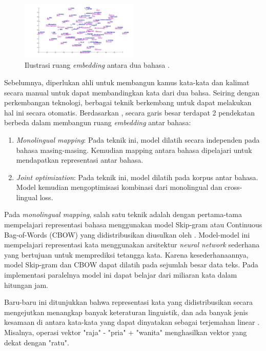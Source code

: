 \documentclass[conference]{IEEEtran}
\begin{document}
	\begin{figure}[htbp]
	    \centerline{
	    \includegraphics[width=0.5\textwidth]{resources/luong_et_al_2015.jpg}}
	    \caption{Ilustrasi ruang \textit{embedding} antara dua bahasa \cite{b8}.}
	    \label{fig:ilustrasi_embedding}
	\end{figure}

	Sebelumnya, diperlukan ahli untuk membangun kamus kata-kata dan kalimat secara manual untuk dapat membandingkan kata dari dua bahsa. Seiring dengan perkembangan teknologi, berbagai teknik berkembang untuk dapat melakukan hal ini secara otomatis. Berdasarkan \cite{b9}, secara garis besar terdapat 2 pendekatan berbeda dalam membangun ruang \textit{embedding} antar bahasa:

	\begin{enumerate}
	    \item \textit{Monolingual mapping}: Pada teknik ini, model dilatih secara independen pada bahasa masing-masing. Kemudian mapping antara bahasa dipelajari untuk mendapatkan representasi antar bahasa.

	    \item \textit{Joint optimization}: Pada teknik ini, model dilatih pada korpus antar bahasa. Model kemudian mengoptimisasi kombinasi dari monolingual dan cross-lingual loss.
	\end{enumerate}

	Pada \textit{monolingual mapping}, salah satu teknik adalah dengan pertama-tama mempelajari representasi bahasa menggunakan model Skip-gram atau Continuous Bag-of-Words (CBOW) yang didistribusikan diusulkan oleh \cite{b10}. Model-model ini mempelajari representasi kata menggunakan arsitektur \textit{neural network} sederhana yang bertujuan untuk memprediksi tetangga kata. Karena kesederhanaannya, model Skip-gram dan CBOW dapat dilatih pada sejumlah besar data teks. Pada implementasi paralelnya model ini dapat belajar dari miliaran kata dalam hitungan jam.

	Baru-baru ini ditunjukkan bahwa representasi kata yang didistribusikan secara mengejutkan menangkap banyak keteraturan linguistik, dan ada banyak jenis kesamaan di antara kata-kata yang dapat dinyatakan sebagai terjemahan linear \cite{b11}. Misalnya, operasi vektor "raja" - "pria" + "wanita" menghasilkan vektor yang dekat dengan "ratu".
\end{document}
